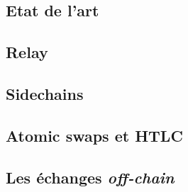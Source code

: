 \subsection{Etat de l'art}


\subsection[Relay]{Relay}


\subsection[Relay]{Sidechains}


\subsection[Atomic swaps et HTLC]{Atomic swaps et HTLC}


\subsection[Échanges "off-chain"]{Les échanges \textit{off-chain}}
